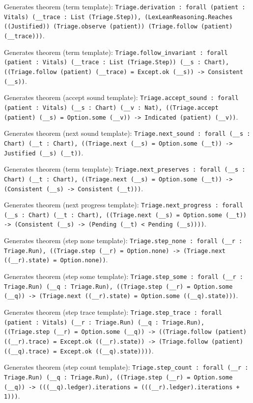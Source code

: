 \documentclass[11pt]{article}
\begin{document}
\noindent Generates theorem (term template): \texttt{Triage.derivation : forall (patient : Vitals) (\_\_trace : List (Triage.Step)), (LexLeanReasoning.Reaches ((Justified)) (Triage.observe (patient)) (Triage.follow (patient) (\_\_trace)))}.\par
\noindent Generates theorem (term template): \texttt{Triage.follow\_invariant : forall (patient : Vitals) (\_\_trace : List (Triage.Step)) (\_\_s : Chart), ((Triage.follow (patient) (\_\_trace) = Except.ok (\_\_s)) -> Consistent (\_\_s))}.\par
\noindent Generates theorem (accept sound template): \texttt{Triage.accept\_sound : forall (patient : Vitals) (\_\_s : Chart) (\_\_v : Nat), ((Triage.accept (patient) (\_\_s) = Option.some (\_\_v)) -> Indicated (patient) (\_\_v))}.\par
\noindent Generates theorem (next sound template): \texttt{Triage.next\_sound : forall (\_\_s : Chart) (\_\_t : Chart), ((Triage.next (\_\_s) = Option.some (\_\_t)) -> Justified (\_\_s) (\_\_t))}.\par
\noindent Generates theorem (term template): \texttt{Triage.next\_preserves : forall (\_\_s : Chart) (\_\_t : Chart), ((Triage.next (\_\_s) = Option.some (\_\_t)) -> (Consistent (\_\_s) -> Consistent (\_\_t)))}.\par
\noindent Generates theorem (next progress template): \texttt{Triage.next\_progress : forall (\_\_s : Chart) (\_\_t : Chart), ((Triage.next (\_\_s) = Option.some (\_\_t)) -> (Consistent (\_\_s) -> (Pending (\_\_t) < Pending (\_\_s))))}.\par
\noindent Generates theorem (step none template): \texttt{Triage.step\_none : forall (\_\_r : Triage.Run), ((Triage.step (\_\_r) = Option.none) -> (Triage.next ((\_\_r).state) = Option.none))}.\par
\noindent Generates theorem (step some template): \texttt{Triage.step\_some : forall (\_\_r : Triage.Run) (\_\_q : Triage.Run), ((Triage.step (\_\_r) = Option.some (\_\_q)) -> (Triage.next ((\_\_r).state) = Option.some ((\_\_q).state)))}.\par
\noindent Generates theorem (step trace template): \texttt{Triage.step\_trace : forall (patient : Vitals) (\_\_r : Triage.Run) (\_\_q : Triage.Run), ((Triage.step (\_\_r) = Option.some (\_\_q)) -> ((Triage.follow (patient) ((\_\_r).trace) = Except.ok ((\_\_r).state)) -> (Triage.follow (patient) ((\_\_q).trace) = Except.ok ((\_\_q).state))))}.\par
\noindent Generates theorem (step count template): \texttt{Triage.step\_count : forall (\_\_r : Triage.Run) (\_\_q : Triage.Run), ((Triage.step (\_\_r) = Option.some (\_\_q)) -> (((\_\_q).ledger).iterations = (((\_\_r).ledger).iterations + 1)))}.\par
\end{document}
